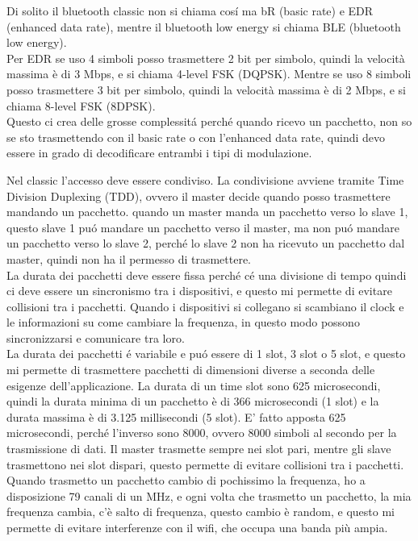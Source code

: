 Di solito il bluetooth classic non si chiama cosí ma bR (basic rate) e EDR (enhanced data rate), mentre il bluetooth low energy si chiama BLE (bluetooth low energy).\\

Per EDR se uso 4 simboli posso trasmettere 2 bit per simbolo, quindi la velocità massima è di 3 Mbps, e si chiama 4-level FSK (DQPSK). Mentre se uso 8 simboli posso trasmettere 3 bit per simbolo, quindi la velocità massima è di 2 Mbps, e si chiama 8-level FSK (8DPSK).\\

Questo ci crea delle grosse complessitá perché quando ricevo un pacchetto, non so se sto trasmettendo con il basic rate o con l'enhanced data rate, quindi devo essere in grado di decodificare entrambi i tipi di modulazione. 

Nel classic l'accesso deve essere condiviso. La condivisione avviene tramite Time Division Duplexing (TDD), ovvero il master decide quando posso trasmettere mandando un pacchetto. quando un master manda un pacchetto verso lo slave 1, questo slave 1 puó mandare un pacchetto verso il master, ma non puó mandare un pacchetto verso lo slave 2, perché lo slave 2 non ha ricevuto un pacchetto dal master, quindi non ha il permesso di trasmettere.\\
La durata dei pacchetti deve essere fissa perché cé una divisione di tempo quindi ci deve essere un sincronismo tra i dispositivi, e questo mi permette di evitare collisioni tra i pacchetti. Quando i dispositivi si collegano si scambiano il clock e le informazioni su come cambiare la frequenza, in questo modo possono sincronizzarsi e comunicare tra loro.\\
La durata dei pacchetti é variabile e puó essere di 1 slot, 3 slot o 5 slot, e questo mi permette di trasmettere pacchetti di dimensioni diverse a seconda delle esigenze dell'applicazione. La durata di un time slot sono 625 microsecondi, quindi la durata minima di un pacchetto è di 366 microsecondi (1 slot) e la durata massima è di 3.125 millisecondi (5 slot). E' fatto apposta 625 microsecondi, perché l'inverso sono 8000, ovvero 8000 simboli al secondo per la trasmissione di dati.
Il master trasmette sempre nei slot pari, mentre gli slave trasmettono nei slot dispari, questo permette di evitare collisioni tra i pacchetti.\\

Quando trasmetto un pacchetto cambio di pochissimo la frequenza, ho a disposizione 79 canali di un MHz, e ogni volta che trasmetto un pacchetto, la mia frequenza cambia, c'è salto di frequenza, questo cambio è random, e questo mi permette di evitare interferenze con il wifi, che occupa una banda più ampia.\\


